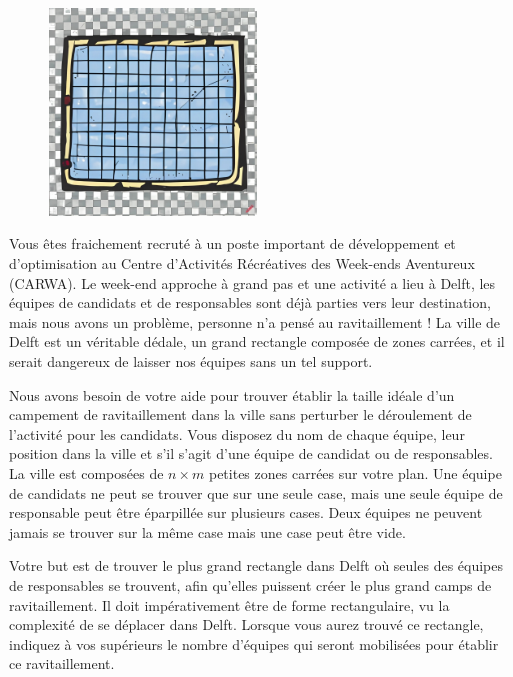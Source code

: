 \problemname{\problemyamlname}


\begin{figure}
    \centering
    \includegraphics[width=5.5cm]{ravitaillement.jpg}
\end{figure}
Vous êtes fraichement recruté à un poste important de développement et
d'optimisation au Centre d'Activités Récréatives des Week-ends
Aventureux (CARWA). Le week-end approche à grand pas et une activité a lieu à Delft,
les équipes de candidats et de responsables sont déjà parties vers leur destination,
mais nous avons un problème, personne n'a pensé au ravitaillement !
La ville de Delft est un véritable dédale, un grand rectangle composée de zones carrées,
et il serait dangereux de laisser nos équipes sans un tel support.

Nous avons besoin de votre aide pour trouver établir la taille idéale d'un
campement de ravitaillement dans la ville sans perturber le déroulement de l'activité pour les candidats.
Vous disposez du nom de chaque équipe, leur position dans la ville et s'il s'agit d'une
équipe de candidat ou de responsables. La ville est composées de $n \times m$ petites zones carrées sur votre plan.
Une équipe de candidats ne peut se trouver que sur une seule case, mais une seule équipe de responsable peut être éparpillée sur plusieurs cases.
Deux équipes ne peuvent jamais se trouver sur la même case mais une case peut être vide.

Votre but est de trouver le plus grand rectangle dans Delft où
seules des équipes de responsables se trouvent, afin qu'elles puissent créer le plus
grand camps de ravitaillement. Il doit impérativement être de forme rectangulaire, vu la complexité de se déplacer dans Delft.
Lorsque vous aurez trouvé ce rectangle, indiquez à vos supérieurs le nombre d'équipes qui seront mobilisées pour établir ce ravitaillement.

